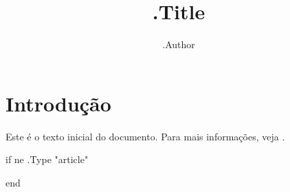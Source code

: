 \documentclass{ {{.Variables.document_class}} }
\title{\textbf{ {{.Title}} }}
\author{ {{.Author}} }
\begin{document}
\maketitle

\section{Introdução}
Este é o texto inicial do documento. Para mais informações, veja \cite{exemplo}.

{{if ne .Type "article"}}




{{end}}



\end{document}
